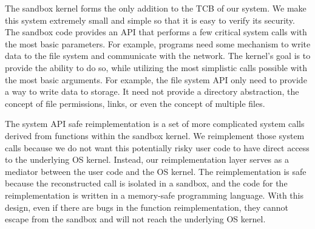 {The sandbox kernel forms the only addition to the TCB of our system.  We
make this system extremely small and simple so that it is easy to verify its
security. 
 The sandbox code provides an API that performs
a few critical system calls with the most basic parameters.  For example,
programs need some mechanism to write data to the file system
and communicate with the network.  The kernel's goal is to provide the ability
to do so, while utilizing the most simplistic calls possible with the most
basic arguments. For example, the file system API only need to provide a way
to write data to storage.  It need not provide a directory abstraction, the
concept of file permissions, links, or even the concept of multiple files.


The system API safe reimplementation is a set of more complicated system calls
derived from functions within the sandbox kernel. 
We reimplement those system calls because we do not want this potentially risky user code
to have direct access to the underlying OS kernel.
Instead, our reimplementation layer serves as a mediator between the user code
and the OS kernel. The reimplementation is safe
because the reconstructed call is isolated in a sandbox, and the code for the
reimplementation is written in a memory-safe programming language.
With this design, even if there are bugs in the function reimplementation,
they cannot escape from the sandbox and will not reach the underlying OS kernel.

}
